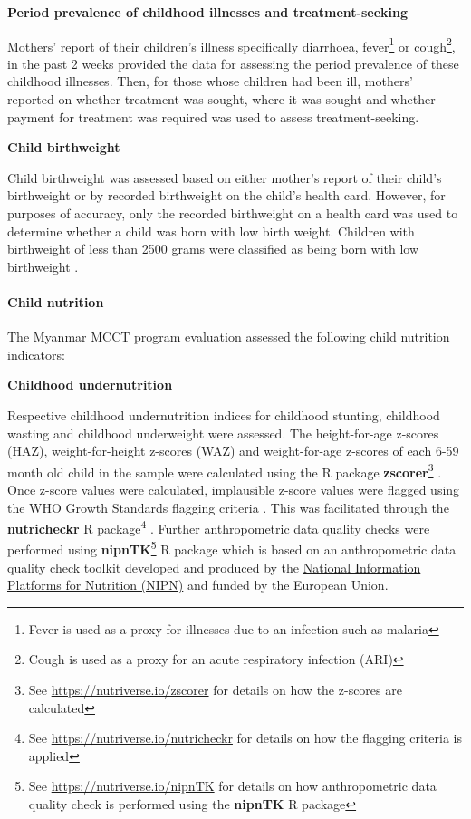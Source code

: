 \documentclass[12pt,a4paper]{article}
\let\oldparagraph\paragraph
\renewcommand{\paragraph}[1]{\oldparagraph{#1}\mbox{}}
\let\rmarkdownfootnote\footnote%
\def\footnote{\protect\rmarkdownfootnote}
\begin{document}
\newpage

\textbf{Period prevalence of childhood illnesses and treatment-seeking}

Mothers' report of their children's illness specifically diarrhoea, fever\footnote{Fever is used as a proxy for illnesses due to an infection such as malaria} or cough\footnote{Cough is used as a proxy for an acute respiratory infection (ARI)}, in the past 2 weeks provided the data for assessing the period prevalence of these childhood illnesses. Then, for those whose children had been ill, mothers' reported on whether treatment was sought, where it was sought and whether payment for treatment was required was used to assess treatment-seeking.

\textbf{Child birthweight}

Child birthweight was assessed based on either mother's report of their child's birthweight or by recorded birthweight on the child's health card. However, for purposes of accuracy, only the recorded birthweight on a health card was used to determine whether a child was born with low birth weight. Children with birthweight of less than 2500 grams were classified as being born with low birthweight \citep{Woertman:1993hp, Kelly:1997wa}.

\hypertarget{cnut}{%
\paragraph{Child nutrition}\label{cnut}}

The Myanmar MCCT program evaluation assessed the following child nutrition indicators:

\textbf{Childhood undernutrition}

Respective childhood undernutrition indices for childhood stunting, childhood wasting and childhood underweight were assessed. The height-for-age z-scores (HAZ), weight-for-height z-scores (WAZ) and weight-for-age z-scores of each 6-59 month old child in the sample were calculated using the R package \textbf{zscorer}\footnote{See \url{https://nutriverse.io/zscorer} for details on how the z-scores are calculated} \citep{zscorer2019}. Once z-score values were calculated, implausible z-score values were flagged using the WHO Growth Standards flagging criteria \citep{WorldHealthOrganizationWHO2006}. This was facilitated through the \textbf{nutricheckr} R package\footnote{See \url{https://nutriverse.io/nutricheckr} for details on how the flagging criteria is applied} \citep{nutricheckr2019}. Further anthropometric data quality checks were performed using \textbf{nipnTK}\footnote{See \url{https://nutriverse.io/nipnTK} for details on how anthropometric data quality check is performed using the \textbf{nipnTK} R package} \citep{nipnTK2019} R package which is based on an anthropometric data quality check toolkit developed and produced by the \href{http://www.nipn-nutrition-platforms.org}{National Information Platforms for Nutrition (NIPN)} and funded by the European Union.
\end{document}

